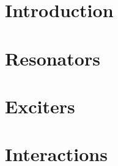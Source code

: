 \def\mtt{\mu_{tt}} 
\def\mtd{\mu_{t\cdot}} 
\def\mtp{\mu_{t+}} 
\def\mtm{\mu_{t-}} 

\def\mxx{\mu_{xx}} 
\def\mxd{\mu_{x\cdot}} 
\def\mxp{\mu_{x+}} 
\def\mxm{\mu_{x-}} 

\def\dTwoD{\delta_{\Delta}}

\def\Dxx{\mathbf{D}_{xx}}
\def\Dxxxx{\mathbf{D}_{xxxx}}

\def\sz{\sigma_{0}}
\def\so{\sigma_{1}}
\def\vrel{v_\text{rel}}
\def\Sbar{\bar{S}}
\def\Sm{S_{l-1/2}}
\def\Sp{S_{l+1/2}}

\def\szX[#1]{\sigma_{0{#1}}}
\def\soX[#1]{\sigma_{1{#1}}}

\def\fs{f_\text{s}}
\def\el{\epsilon_\text{l}}
\def\er{\epsilon_\text{r}}
\def\D{\mathcal{D}}
\def\L{\mathcal{L}}
\def\O{\mathcal{O}}
\def\S{\mathcal{S}}

\def\floor[#1]{\left\lfloor #1 \right\rfloor}
\def\ceil[#1]{\left\lceil #1 \right\rceil}
\def\ansatz{\ \overset{\mathcal{A}}{\Longrightarrow}\ }
\def\qaq{\quad \text{and} \quad}
\def\qwiq{\quad \text{with} \quad}
\def\qwhq{\quad \text{where} \quad}

\def\mystrut{\rule[-.2\baselineskip]{0pt}{\baselineskip}}

\def\th{\textsuperscript{th} }
\def\thOrder{\textsuperscript{th}-order }

\def\boldPhi{\boldsymbol{\phi}}
\def\eig{\text{eig}}
\mainmatter

\part{Introduction}\label{part:introduction}


\part{Resonators}\label{part:resonators}


\part{Exciters}\label{part:exciters}


\part{Interactions}\label{part:interactions}


